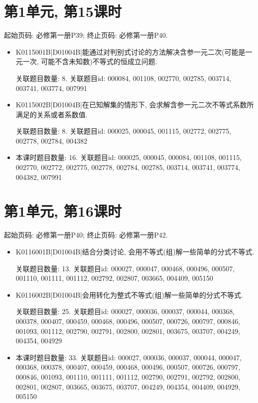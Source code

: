 \section*{第1单元, 第15课时}
起始页码: 必修第一册P39; 终止页码: 必修第一册P40.
\begin{itemize}
\item K0115001B|D01004B|能通过对判别式讨论的方法解决含参一元二次(可能是一元一次, 可能不含未知数)不等式的恒成立问题.

关联题目数量: 8. 关联题目id: 000084, 001108, 002770, 002785, 003714, 003741, 003774, 007991

\item K0115002B|D01004B|在已知解集的情形下, 会求解含参一元二次不等式系数所满足的关系或者系数值.

关联题目数量: 8. 关联题目id: 000025, 000045, 001115, 002772, 002775, 002778, 002784, 004382

\item 本课时题目数量: 16. 关联题目id: 000025, 000045, 000084, 001108, 001115, 002770, 002772, 002775, 002778, 002784, 002785, 003714, 003741, 003774, 004382, 007991

\end{itemize}

\section*{第1单元, 第16课时}
起始页码: 必修第一册P40; 终止页码: 必修第一册P42.
\begin{itemize}
\item K0116001B|D01004B|结合分类讨论, 会用不等式(组)解一些简单的分式不等式.

关联题目数量: 13. 关联题目id: 000027, 000047, 000468, 000496, 000507, 001110, 001111, 001112, 002792, 002807, 003665, 004409, 005150

\item K0116002B|D01004B|会用转化为整式不等式(组)解一些简单的分式不等式.

关联题目数量: 25. 关联题目id: 000027, 000036, 000037, 000044, 000368, 000378, 000407, 000459, 000468, 000496, 000507, 000726, 000797, 000846, 001093, 001112, 002790, 002791, 002800, 002801, 003675, 003707, 004249, 004354, 004929

\item 本课时题目数量: 33. 关联题目id: 000027, 000036, 000037, 000044, 000047, 000368, 000378, 000407, 000459, 000468, 000496, 000507, 000726, 000797, 000846, 001093, 001110, 001111, 001112, 002790, 002791, 002792, 002800, 002801, 002807, 003665, 003675, 003707, 004249, 004354, 004409, 004929, 005150

\end{itemize}

